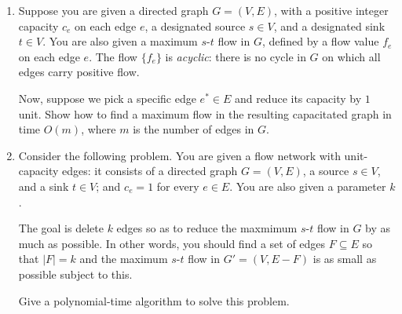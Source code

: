\documentclass[12pt]{article}
\begin{document}
\begin{enumerate}


\item

Suppose you are given a directed graph $G = (V,E)$, with
a positive integer capacity $c_e$ on each edge $e$,
a designated source $s \in V$, and a designated sink $t \in V$.
You are also given a maximum $s$-$t$ flow in $G$,
defined by a flow value $f_e$ on each edge $e$.
The flow $\{f_e\}$ is {\em acyclic}: there is
no cycle in $G$ on which all edges carry positive flow.

Now, suppose we pick a specific edge $e^* \in E$
and reduce its capacity by $1$ unit.
Show how to find a maximum flow in the resulting
capacitated graph in time $O(m)$,
where $m$ is the number of edges in $G$.


\item

Consider the following problem.
You are given a flow network with unit-capacity edges:
it consists of a directed graph $G = (V,E)$, a source $s \in V$,
and a sink $t \in V$; and $c_e = 1$ for every $e \in E$.
You are also given a parameter $k$.

The goal is delete $k$ edges so as to reduce
the maxmimum $s$-$t$ flow in $G$ by as much as possible.
In other words, you should find a set of edges $F \subseteq E$
so that $|F| = k$ and
the maximum $s$-$t$ flow in $G' = (V,E - F)$ is as
small as possible subject to this.

Give a polynomial-time algorithm to solve this problem.

\end{enumerate}
\end{document}
